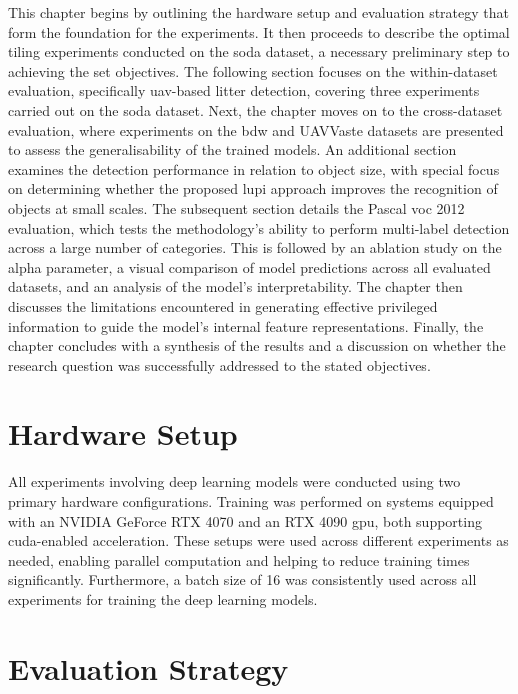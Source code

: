 This chapter begins by outlining the hardware setup and evaluation strategy that form the foundation for the experiments. It then proceeds to describe the optimal tiling experiments conducted on the \gls{soda} dataset, a necessary preliminary step to achieving the set objectives. The following section focuses on the within-dataset evaluation, specifically \gls{uav}-based litter detection, covering three experiments carried out on the \gls{soda} dataset. Next, the chapter moves on to the cross-dataset evaluation, where experiments on the \gls{bdw} and UAVVaste datasets are presented to assess the generalisability of the trained models. An additional section examines the detection performance in relation to object size, with special focus on determining whether the proposed \gls{lupi} approach improves the recognition of objects at small scales. The subsequent section details the Pascal \gls{voc} 2012 evaluation, which tests the methodology's ability to perform multi-label detection across a large number of categories. This is followed by an ablation study on the alpha parameter, a visual comparison of model predictions across all evaluated datasets, and an analysis of the model's interpretability. The chapter then discusses the limitations encountered in generating effective privileged information to guide the model’s internal feature representations. Finally, the chapter concludes with a synthesis of the results and a discussion on whether the research question was successfully addressed to the stated objectives.

\section{Hardware Setup}
\label{sec:5_hardware_setup}

All experiments involving deep learning models were conducted using two primary hardware configurations. Training was performed on systems equipped with an NVIDIA GeForce RTX 4070 and an RTX 4090 \gls{gpu}, both supporting \gls{cuda}-enabled acceleration. These setups were used across different experiments as needed, enabling parallel computation and helping to reduce training times significantly. Furthermore, a batch size of 16 was consistently used across all experiments for training the deep learning models.

\section{Evaluation Strategy}
\label{sec:5_evaluation_strategy}


